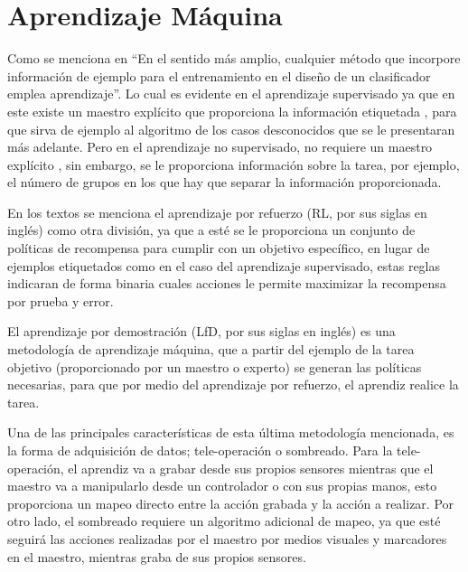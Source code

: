 \section{Aprendizaje M\'aquina}

Como se menciona en \cite{9780471056690} ``En el sentido m\'as amplio,
 cualquier m\'etodo que incorpore informaci\'on de ejemplo para el 
 entrenamiento en el dise\~no de un clasificador emplea aprendizaje''.
 Lo cual es evidente en el aprendizaje supervisado ya que en este existe 
 un maestro expl\'icito que proporciona la informaci\'on etiquetada
 \cite{9780471056690}, para que sirva de ejemplo al algoritmo de los casos 
 desconocidos que se le presentaran m\'as adelante. Pero en el aprendizaje 
 no supervisado, no requiere un maestro expl\'icito \cite{9780471056690}, sin 
 embargo, se le proporciona informaci\'on sobre la tarea, por ejemplo, el 
 n\'umero de grupos en los que hay que separar la informaci\'on proporcionada.


En los textos \cite{9780471056690, 9780387310732} se menciona el aprendizaje 
 por refuerzo (RL, por sus siglas en ingl\'es) como otra divisi\'on, ya que 
 a est\'e se le proporciona un conjunto de pol\'iticas de recompensa para 
 cumplir con un objetivo espec\'ifico, en lugar de ejemplos etiquetados como 
 en el caso del aprendizaje supervisado, estas reglas indicaran de forma 
 binaria cuales acciones le permite maximizar la recompensa por prueba y error.


El aprendizaje por demostraci\'on (LfD, por sus siglas en ingl\'es)
 \cite{ARGALL2009469} es una metodolog\'ia de aprendizaje m\'aquina, que a 
 partir del ejemplo de la tarea objetivo (proporcionado por un maestro o
 experto) se generan las pol\'iticas necesarias, para que por medio del 
 aprendizaje por refuerzo, el aprendiz realice la tarea.


Una de las principales caracter\'isticas de esta \'ultima metodolog\'ia
 mencionada, es la forma de adquisici\'on de datos; tele-operaci\'on o 
 sombreado. Para la tele-operaci\'on\cite{ARGALL2009469}, el aprendiz va 
 a grabar desde sus propios sensores mientras que el maestro va a manipularlo 
 desde un controlador o con sus propias manos, esto proporciona 
 un mapeo directo entre la acci\'on grabada y la acci\'on a realizar. Por 
 otro lado, el sombreado\cite{ARGALL2009469} requiere un algoritmo adicional 
 de mapeo, ya que est\'e seguir\'a las acciones realizadas por el maestro por 
 medios visuales y marcadores en el maestro, mientras graba de sus propios 
 sensores. 


